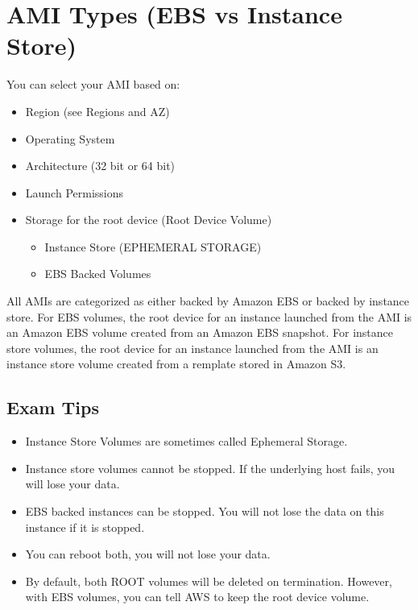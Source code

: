 \documentclass{article}
\begin{document}
\section{AMI Types (EBS vs Instance Store)}
You can select your AMI based on:
\begin{itemize}
\item
Region (see Regions and AZ)

\item
Operating System

\item
Architecture (32 bit or 64 bit)

\item
Launch Permissions

\item
Storage for the root device (Root Device Volume)
	\begin{itemize}
	\item
	Instance Store (EPHEMERAL STORAGE)
	
	\item
	EBS Backed Volumes
	\end{itemize}

\end{itemize}
All AMIs are categorized as either backed by Amazon EBS or backed by instance store. For EBS volumes, the root device for an instance launched from the AMI is an Amazon EBS volume created from an Amazon EBS snapshot. For instance store volumes, the root device for an instance launched from the AMI is an instance store volume created from a remplate stored in Amazon S3.

\subsection{Exam Tips}
\begin{itemize}
\item
Instance Store Volumes are sometimes called Ephemeral Storage.

\item
Instance store volumes cannot be stopped. If the underlying host fails, you will lose your data.

\item
EBS backed instances can be stopped. You will not lose the data on this instance if it is stopped.

\item
You can reboot both, you will not lose your data.

\item
By default, both ROOT volumes will be deleted on termination. However, with EBS volumes, you can tell AWS to keep the root device volume.
\end{itemize}
\end{document}
